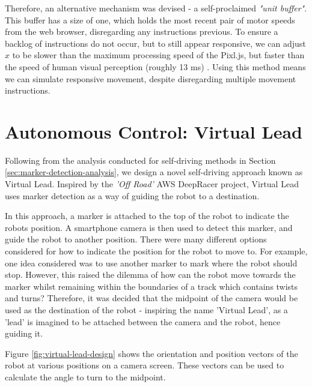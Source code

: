 \documentclass{l4proj}
\begin{document}
Therefore, an alternative mechanism was devised - a self-proclaimed \textit{"unit buffer"}. This buffer has a size of one, which holds the most recent pair of motor speeds from the web browser, disregarding any instructions previous. To ensure a backlog of instructions do not occur, but to still appear responsive, we can adjust $x$ to be slower than the maximum processing speed of the Pixl.js, but faster than the speed of human visual perception (roughly 13 ms) \citep{burger2015fast}. Using this method means we can simulate responsive movement, despite disregarding multiple movement instructions.


\section{Autonomous Control: Virtual Lead}\label{sec:virtual-lead-design}
Following from the analysis conducted for self-driving methods in Section \ref{sec:marker-detection-analysis}, we design a novel self-driving approach known as Virtual Lead. Inspired by the \textit{'Off Road'} AWS DeepRacer project, Virtual Lead uses marker detection as a way of guiding the robot to a destination.

In this approach, a marker is attached to the top of the robot to indicate the robots position. A smartphone camera is then used to detect this marker, and guide the robot to another position. There were many different options considered for how to indicate the position for the robot to move to. For example, one idea considered was to use another marker to mark where the robot should stop. However, this raised the dilemma of how can the robot move towards the marker whilst remaining within the boundaries of a track which contains twists and turns? Therefore, it was decided that the midpoint of the camera would be used as the destination of the robot - inspiring the name 'Virtual Lead', as a 'lead' is imagined to be attached between the camera and the robot, hence guiding it.

Figure \ref{fig:virtual-lead-design} shows the orientation and position vectors of the robot at various positions on a camera screen. These vectors can be used to calculate the angle to turn to the midpoint.
\end{document}
